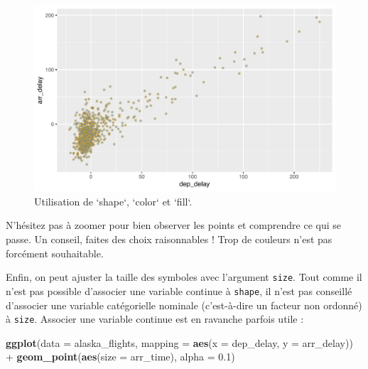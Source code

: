 \documentclass[
  a4paper,
]{article}
\newenvironment{Shaded}{\begin{snugshade}}{\end{snugshade}}
\newcommand{\DataTypeTok}[1]{\textcolor[rgb]{0.00,0.34,0.68}{#1}}
\newcommand{\FloatTok}[1]{\textcolor[rgb]{0.69,0.50,0.00}{#1}}
\newcommand{\KeywordTok}[1]{\textcolor[rgb]{0.12,0.11,0.11}{\textbf{#1}}}
\newcommand{\NormalTok}[1]{\textcolor[rgb]{0.12,0.11,0.11}{#1}}
\newcommand{\OperatorTok}[1]{\textcolor[rgb]{0.12,0.11,0.11}{#1}}
\newcommand{\StringTok}[1]{\textcolor[rgb]{0.75,0.01,0.01}{#1}}
\begin{document}
\begin{figure}[htpb]

{\centering \includegraphics[width=0.9\linewidth]{figure/shapecolorplot-1} 

}

\caption{Utilisation de `shape`, `color` et `fill`.}\label{fig:shapecolorplot}
\end{figure}

N'hésitez pas à zoomer pour bien observer les points et comprendre ce qui se passe. Un conseil, faites des choix raisonnables ! Trop de couleurs n'est pas forcément souhaitable.

Enfin, on peut ajuster la taille des symboles avec l'argument \texttt{size}. Tout comme il n'est pas possible d'associer une variable continue à \texttt{shape}, il n'est pas conseillé d'associer une variable catégorielle nominale (c'est-à-dire un facteur non ordonné) à \texttt{size}. Associer une variable continue est en ravanche parfois utile :

\begin{Shaded}
\begin{Highlighting}[]
\KeywordTok{ggplot}\NormalTok{(}\DataTypeTok{data =}\NormalTok{ alaska_flights, }\DataTypeTok{mapping =} \KeywordTok{aes}\NormalTok{(}\DataTypeTok{x =}\NormalTok{ dep_delay, }\DataTypeTok{y =}\NormalTok{ arr_delay)) }\OperatorTok{+}
\StringTok{  }\KeywordTok{geom_point}\NormalTok{(}\KeywordTok{aes}\NormalTok{(}\DataTypeTok{size =}\NormalTok{ arr_time), }\DataTypeTok{alpha =} \FloatTok{0.1}\NormalTok{)}
\end{Highlighting}
\end{Shaded}
\end{document}
